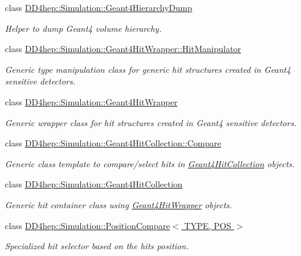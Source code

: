 \begin{DoxyCompactItemize}
class \hyperlink{class_d_d4hep_1_1_simulation_1_1_geant4_hierarchy_dump}{D\+D4hep\+::\+Simulation\+::\+Geant4\+Hierarchy\+Dump}
\begin{DoxyCompactList}\small\item\em Helper to dump Geant4 volume hierarchy. \end{DoxyCompactList}\item 
class \hyperlink{class_d_d4hep_1_1_simulation_1_1_geant4_hit_wrapper_1_1_hit_manipulator}{D\+D4hep\+::\+Simulation\+::\+Geant4\+Hit\+Wrapper\+::\+Hit\+Manipulator}
\begin{DoxyCompactList}\small\item\em Generic type manipulation class for generic hit structures created in Geant4 sensitive detectors. \end{DoxyCompactList}\item 
class \hyperlink{class_d_d4hep_1_1_simulation_1_1_geant4_hit_wrapper}{D\+D4hep\+::\+Simulation\+::\+Geant4\+Hit\+Wrapper}
\begin{DoxyCompactList}\small\item\em Generic wrapper class for hit structures created in Geant4 sensitive detectors. \end{DoxyCompactList}\item 
class \hyperlink{class_d_d4hep_1_1_simulation_1_1_geant4_hit_collection_1_1_compare}{D\+D4hep\+::\+Simulation\+::\+Geant4\+Hit\+Collection\+::\+Compare}
\begin{DoxyCompactList}\small\item\em Generic class template to compare/select hits in \hyperlink{class_d_d4hep_1_1_simulation_1_1_geant4_hit_collection}{Geant4\+Hit\+Collection} objects. \end{DoxyCompactList}\item 
class \hyperlink{class_d_d4hep_1_1_simulation_1_1_geant4_hit_collection}{D\+D4hep\+::\+Simulation\+::\+Geant4\+Hit\+Collection}
\begin{DoxyCompactList}\small\item\em Generic hit container class using \hyperlink{class_d_d4hep_1_1_simulation_1_1_geant4_hit_wrapper}{Geant4\+Hit\+Wrapper} objects. \end{DoxyCompactList}\item 
class \hyperlink{class_d_d4hep_1_1_simulation_1_1_position_compare}{D\+D4hep\+::\+Simulation\+::\+Position\+Compare$<$ T\+Y\+P\+E, P\+O\+S $>$}
\begin{DoxyCompactList}\small\item\em Specialized hit selector based on the hit\textquotesingle{}s position. \end{DoxyCompactList}\item 

\end{DoxyCompactItemize}
